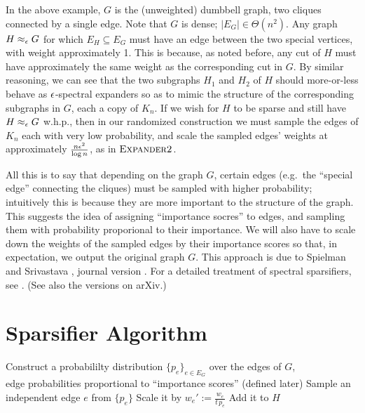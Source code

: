 \documentclass[11pt]{article}
\begin{document}
In the above example, $G$ is the (unweighted) dumbbell graph, two cliques
connected by a single edge. Note that $G$ is dense; $|E_G| \in \Theta(n^2)$.
Any graph $H \approx_\epsilon G$ for which $E_H \subseteq E_G$ must have an edge
between the two special vertices, with weight approximately 1. This is because,
as noted before, any cut of $H$ must have approximately the same weight as the
corresponding cut in $G$. By similar reasoning, we can see that the two
subgraphs $H_1$ and $H_2$ of $H$ should more-or-less behave as $\epsilon$-spectral
expanders so as to mimic the structure of the corresponding subgraphs in $G$,
each a copy of $K_n$. If we wish for $H$ to be sparse and still have $H
\approx_\epsilon G$ w.h.p., then in our randomized construction we must sample the
edges of $K_n$ each with very low probability, and scale the sampled edges'
weights at approximately $\frac{n \epsilon^2}{\log n}$, as in $\textsc{Expander2}$.

All this is to say that depending on the graph $G$, certain edges (e.g.\ the
``special edge'' connecting the cliques) must be sampled with higher
probability; intuitively this is because they are more important to the
structure of the graph. This suggests the idea of assigning ``importance
socres'' to edges, and sampling them with probability proporional to their
importance. We will also have to scale down the weights of the sampled edges by
their importance scores so that, in expectation, we output the original graph
$G$. This approach is due to Spielman and Srivastava \cite{SpielmanS08},
journal version \cite{SpielmanS11}. For a detailed treatment of spectral sparsifiers,
see \cite{SpielmanT08}. (See also the versions on arXiv.)

\section{Sparsifier Algorithm}

\vspace*{-\baselineskip}
\begin{algorithm}
\caption*{$\textsc{Sparsifier}(G,\eps)$:}
\begin{algorithmic}
\State Construct a probabililty distribution $\{p_e\}_{e\in E_G}$
    over the edges of $G$, \\
    edge probabilities proportional to ``importance scores'' (defined later)
\smallskip
\State{}
\Indent
    \vspace*{-0.2em}
    \State Sample an independent edge $e$ from $\{p_e\}$
    \State Scale it by $w_e' := \frac{w_e}{t \, p_e}$
    \State Add it to $H$
\EndIndent
\smallskip
\end{algorithmic}
\end{algorithm}
\end{document}
